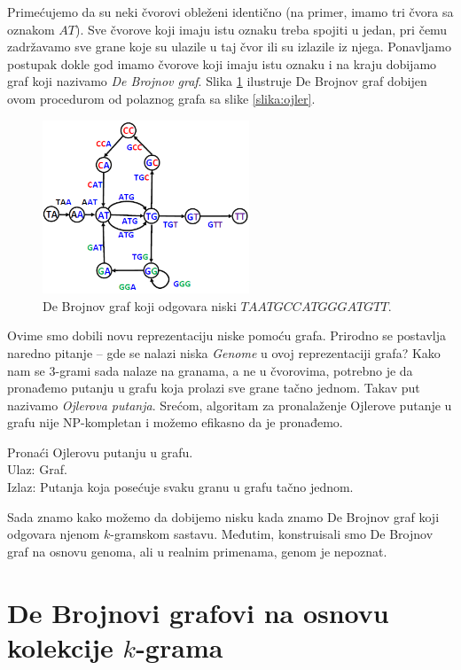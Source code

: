 Primećujemo da su neki čvorovi obleženi identično (na primer, imamo tri čvora sa oznakom $AT$). Sve čvorove koji imaju istu oznaku treba spojiti u jedan, pri čemu zadržavamo sve grane koje su ulazile u taj čvor ili su izlazile iz njega. Ponavljamo postupak dokle god imamo čvorove koji imaju istu oznaku i na kraju dobijamo graf koji nazivamo \emph{De Brojnov graf}. Slika \ref{slika:debrojnov} ilustruje De Brojnov graf dobijen ovom procedurom od polaznog grafa sa slike \ref{slika:ojler}. 

\begin{figure}[h]
	\centering
	\includegraphics[width=0.55\textwidth]{poglavlja/3/slike/debrojnov.png}
	\caption{De Brojnov graf koji odgovara niski $TAATGCCATGGGATGTT$.}
	\label{slika:debrojnov}
\end{figure} 

Ovime smo dobili novu reprezentaciju niske pomoću grafa. Prirodno se postavlja naredno pitanje -- gde se nalazi niska \textit{Genome} u ovoj reprezentaciji grafa? Kako nam se 3-grami sada nalaze na granama, a ne u čvorovima, potrebno je da pronađemo putanju u grafu koja prolazi sve grane tačno jednom. Takav put nazivamo \emph{Ojlerova putanja}. Srećom, algoritam za pronalaženje Ojlerove putanje u grafu nije NP-kompletan i možemo efikasno da je pronađemo.

\begin{problem}
	Pronaći Ojlerovu putanju u grafu. \\
	Ulaz: Graf. \\
	Izlaz: Putanja koja posećuje svaku granu u grafu tačno jednom.
\end{problem}

Sada znamo kako možemo da dobijemo nisku kada znamo De Brojnov graf koji odgovara njenom $k$-gramskom sastavu. Međutim, konstruisali smo De Brojnov graf na osnovu genoma, ali u realnim primenama, genom je nepoznat.

\section{De Brojnovi grafovi na osnovu kolekcije $k$-grama}

